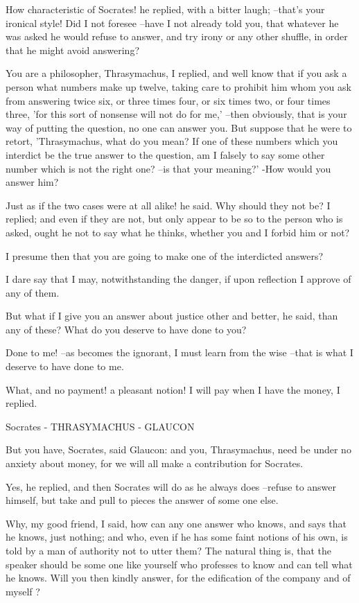 How characteristic of Socrates! he replied, with a bitter laugh; --that's your ironical style! Did I not foresee --have I not already told you, that whatever he was asked he would refuse to answer, and try irony or any other shuffle, in order that he might avoid answering?

You are a philosopher, Thrasymachus, I replied, and well know that if you ask a person what numbers make up twelve, taking care to prohibit him whom you ask from answering twice six, or three times four, or six times two, or four times three, 'for this sort of nonsense will not do for me,' --then obviously, that is your way of putting the question, no one can answer you. But suppose that he were to retort, 'Thrasymachus, what do you mean? If one of these numbers which you interdict be the true answer to the question, am I falsely to say some other number which is not the right one? --is that your meaning?' -How would you answer him?

Just as if the two cases were at all alike! he said.
Why should they not be? I replied; and even if they are not, but only appear to be so to the person who is asked, ought he not to say what he thinks, whether you and I forbid him or not?

I presume then that you are going to make one of the interdicted answers?

I dare say that I may, notwithstanding the danger, if upon reflection I approve of any of them.

But what if I give you an answer about justice other and better, he said, than any of these? What do you deserve to have done to you?

Done to me! --as becomes the ignorant, I must learn from the wise --that is what I deserve to have done to me.

What, and no payment! a pleasant notion!
I will pay when I have the money, I replied.

Socrates - THRASYMACHUS - GLAUCON

But you have, Socrates, said Glaucon: and you, Thrasymachus, need be under no anxiety about money, for we will all make a contribution for Socrates.

Yes, he replied, and then Socrates will do as he always does --refuse to answer himself, but take and pull to pieces the answer of some one else.

Why, my good friend, I said, how can any one answer who knows, and says that he knows, just nothing; and who, even if he has some faint notions of his own, is told by a man of authority not to utter them? The natural thing is, that the speaker should be some one like yourself who professes to know and can tell what he knows. Will you then kindly answer, for the edification of the company and of myself ?

